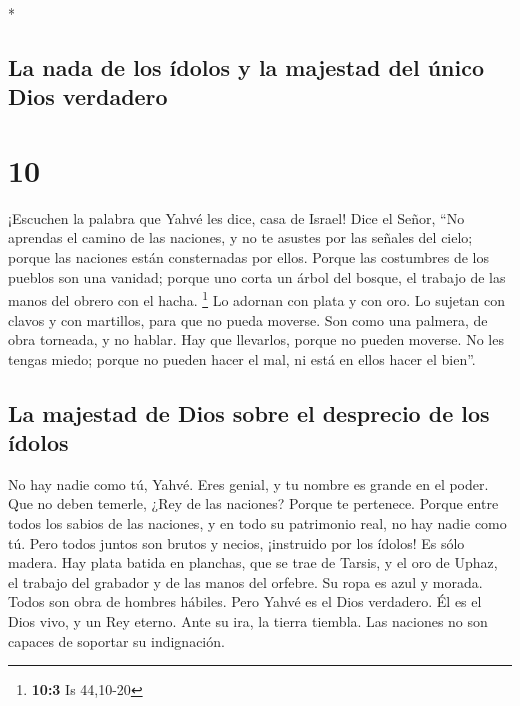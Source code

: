 \begin{paracol}{2}
\switchcolumn[0]*

\hypertarget{la-nada-de-los-uxeddolos-y-la-majestad-del-uxfanico-dios-verdadero}{%
\subsection{La nada de los ídolos y la majestad del único Dios
verdadero}\label{la-nada-de-los-uxeddolos-y-la-majestad-del-uxfanico-dios-verdadero}}

\hypertarget{section-18}{%
\section{10}\label{section-18}}

 ¡Escuchen la palabra que Yahvé les dice, casa de Israel!
 Dice el Señor, ``No aprendas el camino de las naciones, y
no te asustes por las señales del cielo; porque las naciones están
consternadas por ellos.  Porque las costumbres de los
pueblos son una vanidad; porque uno corta un árbol del bosque, el
trabajo de las manos del obrero con el hacha. \footnote{\textbf{10:3} Is
  44,10-20}  Lo adornan con plata y con oro. Lo sujetan
con clavos y con martillos, para que no pueda moverse. 
Son como una palmera, de obra torneada, y no hablar. Hay que llevarlos,
porque no pueden moverse. No les tengas miedo; porque no pueden hacer el
mal, ni está en ellos hacer el bien''.

\hypertarget{la-majestad-de-dios-sobre-el-desprecio-de-los-uxeddolos}{%
\subsection{La majestad de Dios sobre el desprecio de los
ídolos}\label{la-majestad-de-dios-sobre-el-desprecio-de-los-uxeddolos}}

 No hay nadie como tú, Yahvé. Eres genial, y tu nombre es
grande en el poder.  Que no deben temerle, ¿Rey de las
naciones? Porque te pertenece. Porque entre todos los sabios de las
naciones, y en todo su patrimonio real, no hay nadie como tú.
 Pero todos juntos son brutos y necios, ¡instruido por los
ídolos! Es sólo madera.  Hay plata batida en planchas, que
se trae de Tarsis, y el oro de Uphaz, el trabajo del grabador y de las
manos del orfebre. Su ropa es azul y morada. Todos son obra de hombres
hábiles.  Pero Yahvé es el Dios verdadero. Él es el Dios
vivo, y un Rey eterno. Ante su ira, la tierra tiembla. Las naciones no
son capaces de soportar su indignación.


\end{paracol}
